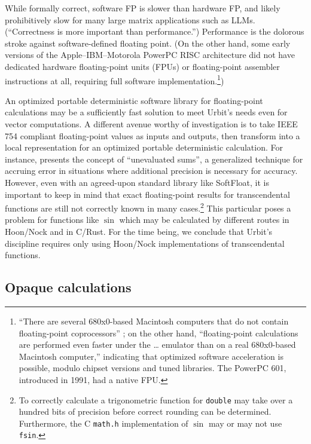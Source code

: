 \documentclass[twoside]{article}
\begin{document}
While formally correct, software FP is slower than hardware FP, and likely prohibitively slow for many large matrix applications such as LLMs.  (“Correctness is more important than performance.”)  Performance is the dolorous stroke against software-defined floating point.  (On the other hand, some early versions of the Apple–IBM–Motorola PowerPC RISC architecture did not have dedicated hardware floating-point units (FPUs) or floating-point assembler instructions at all, requiring full software implementation.\footnote{“There are several 680x0-based Macintosh computers that do not contain floating-point coprocessors” \citep{Apple1994}; on the other hand, “floating-point calculations are performed even faster under the … emulator than on a real 680x0-based Macintosh computer,” indicating that optimized software acceleration is possible, modulo chipset versions and tuned libraries.  The PowerPC 601, introduced in 1991, had a native FPU.})

An optimized portable deterministic software library for floating-point calculations may be a sufficiently fast solution to meet Urbit's needs even for vector computations.  A different avenue worthy of investigation is to take IEEE 754 compliant floating-point values as inputs and outputs, then transform into a local representation for an optimized portable deterministic calculation.  For instance, \citet{Thall2007} presents the concept of “unevaluated sums”, a generalized technique for accruing error in situations where additional precision is necessary for accuracy.  However, even with an agreed-upon standard library like SoftFloat, it is important to keep in mind that exact floating-point results for transcendental functions are still not correctly known in many cases.\footnote{To correctly calculate a trigonometric function for \texttt{double} may take over a hundred bits of precision before correct rounding can be determined.  Furthermore, the C \texttt{math.h} implementation of $\sin$ may or may not use \texttt{fsin}.}  This particular poses a problem for functions like $\sin$ which may be calculated by different routes in Hoon/Nock and in C/Rust.  For the time being, we conclude that Urbit's discipline requires only using Hoon/Nock implementations of transcendental functions.

\subsection{Opaque calculations}
\end{document}
